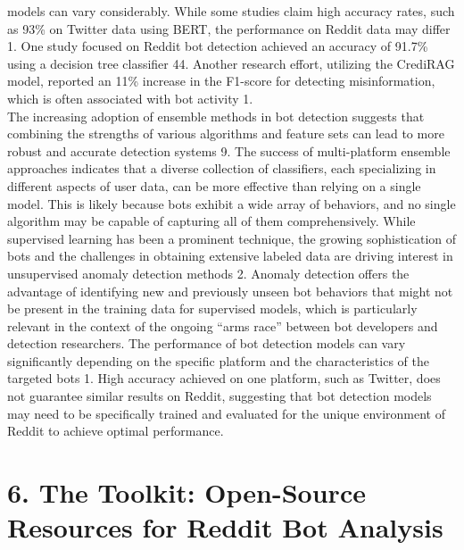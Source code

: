 \documentclass[
  12pt,
  letterpaper,
  DIV=11,
  numbers=noendperiod]{scrartcl}
\begin{document}
models can vary considerably. While some studies claim high accuracy
rates, such as 93\% on Twitter data using BERT, the performance on
Reddit data may differ 1. One study focused on Reddit bot detection
achieved an accuracy of 91.7\% using a decision tree classifier 44.
Another research effort, utilizing the CrediRAG model, reported an 11\%
increase in the F1-score for detecting misinformation, which is often
associated with bot activity 1.\\
The increasing adoption of ensemble methods in bot detection suggests
that combining the strengths of various algorithms and feature sets can
lead to more robust and accurate detection systems 9. The success of
multi-platform ensemble approaches indicates that a diverse collection
of classifiers, each specializing in different aspects of user data, can
be more effective than relying on a single model. This is likely because
bots exhibit a wide array of behaviors, and no single algorithm may be
capable of capturing all of them comprehensively. While supervised
learning has been a prominent technique, the growing sophistication of
bots and the challenges in obtaining extensive labeled data are driving
interest in unsupervised anomaly detection methods 2. Anomaly detection
offers the advantage of identifying new and previously unseen bot
behaviors that might not be present in the training data for supervised
models, which is particularly relevant in the context of the ongoing
``arms race'' between bot developers and detection researchers. The
performance of bot detection models can vary significantly depending on
the specific platform and the characteristics of the targeted bots 1.
High accuracy achieved on one platform, such as Twitter, does not
guarantee similar results on Reddit, suggesting that bot detection
models may need to be specifically trained and evaluated for the unique
environment of Reddit to achieve optimal performance.

\section{\texorpdfstring{\textbf{6. The Toolkit: Open-Source Resources
for Reddit Bot
Analysis}}{6. The Toolkit: Open-Source Resources for Reddit Bot Analysis}}\label{the-toolkit-open-source-resources-for-reddit-bot-analysis}
\end{document}

